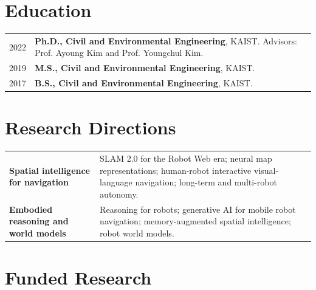 \documentclass[10pt,a4paper]{article}
\newcommand{\daterow}[2]{#1 & #2 \\[2.2pt]}
\begin{document}
\section{Education}
\begin{tabularx}{\textwidth}{@{}L{34mm}Y@{}}
\daterow{2022}{\textbf{Ph.D., Civil and Environmental Engineering}, KAIST. Advisors: Prof. Ayoung Kim and Prof. Youngchul Kim.}
\daterow{2019}{\textbf{M.S., Civil and Environmental Engineering}, KAIST.}
\daterow{2017}{\textbf{B.S., Civil and Environmental Engineering}, KAIST.}
\end{tabularx}

\section{Research Directions}
\begin{tabularx}{\textwidth}{@{}L{47mm}Y@{}}
\textbf{Spatial intelligence for navigation} & SLAM 2.0 for the Robot Web era; neural map representations; human-robot interactive visual-language navigation; long-term and multi-robot autonomy. \\[5pt]
\textbf{Embodied reasoning and world models} & Reasoning for robots; generative AI for mobile robot navigation; memory-augmented spatial intelligence; robot world models. \\[2pt]
\end{tabularx}

\section{Funded Research}
\end{document}
